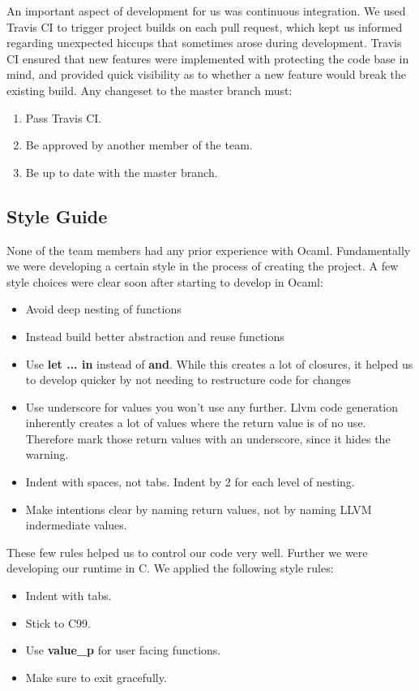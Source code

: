   \medskip \noindent
  An important aspect of development for us was continuous integration. We used Travis CI to trigger project builds on each pull request, which kept us informed regarding unexpected hiccups that sometimes arose during development. Travis CI ensured that new features were implemented with protecting the code base in mind, and provided quick visibility as to whether a new feature would break the existing build. Any changeset to the master branch must:

  \begin{enumerate}
    \item Pass Travis CI.
    \item Be approved by another member of the team.
    \item Be up to date with the master branch.
  \end{enumerate}
  
\subsection{Style Guide}
  None of the team members had any prior experience with Ocaml. Fundamentally we were developing a certain style in the process of creating the project. A few style choices were clear soon after starting to develop in Ocaml:
  \begin{itemize}
  \item Avoid deep nesting of functions
  \item Instead build better abstraction and reuse functions
  \item Use \textbf{let ... in} instead of \textbf{and}. While this creates a lot of closures, it helped us to develop quicker by not needing to restructure code for changes
  \item Use underscore for values you won't use any further. Llvm code generation inherently creates a lot of values where the return value is of no use. Therefore mark those return values with an underscore, since it hides the warning. 
  \item Indent with spaces, not tabs. Indent by 2 for each level of nesting.
  \item Make intentions clear by naming return values, not by naming LLVM indermediate values.
  \end{itemize}
These few rules helped us to control our code very well.\newline
Further we were developing our runtime in C. We applied the following style rules:
  \begin{itemize}
  \item Indent with tabs.
  \item Stick to C99.
  \item Use \textbf{value\_p} for user facing functions.
  \item Make sure to exit gracefully.
  \end{itemize}


